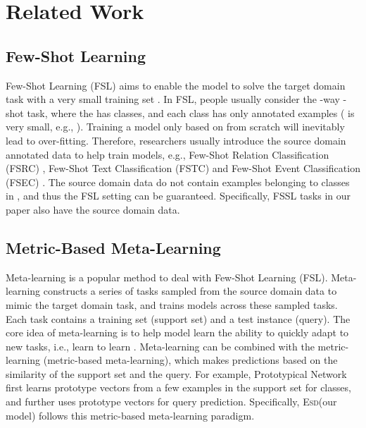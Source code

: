 \documentclass[11pt]{article}
\newcommand{\modelname}{\textsc{Esd}\xspace}
\begin{document}
 
\section{Related Work}
\subsection{Few-Shot Learning}
Few-Shot Learning (FSL) aims to enable the model to solve the target domain task with a very small training set  \cite{fsl}.
In FSL, people usually consider the -way -shot task, where the  has  classes, and each class has only  annotated examples ( is very small, e.g., ).
Training a model only based on  from scratch will inevitably lead to over-fitting.
Therefore, researchers usually introduce the source domain annotated data to help train models, e.g., Few-Shot Relation Classification (FSRC) \cite{fewrel}, Few-Shot Text Classification (FSTC) \cite{fewtc} and Few-Shot Event Classification (FSEC) \cite{wang2021behind}.
The source domain data do not contain examples belonging to classes in , and thus the FSL setting can be guaranteed.
Specifically, FSSL tasks in our paper also have the source domain data. 


\subsection{Metric-Based Meta-Learning}
Meta-learning \cite{meta-learning} is a popular method to deal with Few-Shot Learning (FSL).
Meta-learning constructs a series of tasks sampled from the source domain data to mimic the target domain task, and trains models across these sampled tasks.
Each task contains a training set (support set) and a test instance (query).
The core idea of meta-learning is to help model learn the ability to quickly adapt to new tasks, i.e., learn to learn \cite{l2l}. Meta-learning can be combined with the metric-learning \cite{metric-learning-survey} (metric-based meta-learning), which makes predictions based on the similarity of the support set and the query.
For example, Prototypical Network \cite{Proto} first learns prototype vectors from a few examples in the support set for classes, and further uses prototype vectors for query prediction. Specifically, \modelname (our model) follows this metric-based meta-learning paradigm.
\end{document}
